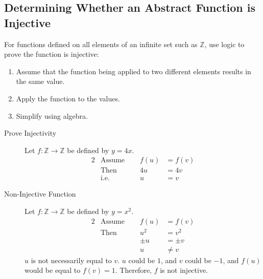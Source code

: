 \documentclass[../notes.tex]{subfiles}
\begin{document}
			\subsection{Determining Whether an Abstract Function is Injective}
				For functions defined on all elements of an infinite set such as $\mathbb{Z}$, use logic to prove the function is injective:
				\nopagebreak
				\begin{enumerate}[nosep]
					\item Assume that the function being applied to two different elements results in the same value.
					\item Apply the function to the values.
					\item Simplify using algebra.
				\end{enumerate}
				\nopagebreak
				\begin{example}
					\begin{description}
						\item[Prove Injectivity] Let $f: \mathbb{Z} \rightarrow \mathbb{Z}$ be defined by $y = 4x$.
							\begin{alignat*}{2}
								& \text{Assume } \quad &f(u) &= f(v)\tag*{$(1)$}\\
								& \text{Then } &4u &= 4v\tag*{$(2)$}\\
								& \text{i.e. } &u &= v\tag*{$(3)$}
							\end{alignat*}
						\item[Non-Injective Function]  Let $f: \mathbb{Z} \rightarrow \mathbb{Z}$ be defined by $y = x^{2}$.
							\begin{alignat*}{2}
								& \text{Assume } \quad &f(u) &= f(v)\\
								& \text{Then } &u^{2} &= v^{2}\\
								& & \pm{u} &= \pm{v}\\
								& & u &\neq v
							\end{alignat*}
							$u$ is not necessarily equal to $v$. $u$ could be $1$, and $v$ could be $-1$, and $f(u)$ would be equal to $f(v) = 1$. Therefore, $f$ is not injective.
					\end{description}
				\end{example}
\end{document}
